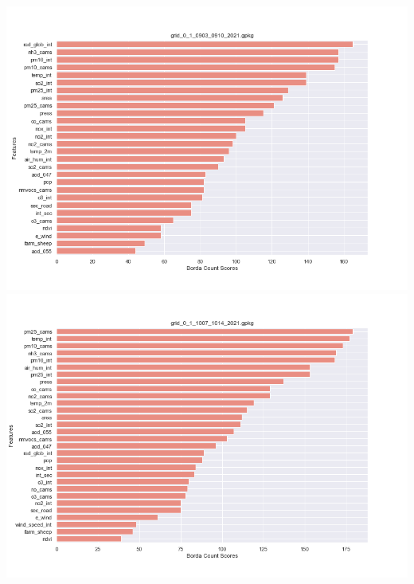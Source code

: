 \begin{center}
\includegraphics[width=.9\textwidth]{images/fs_results/nh3/01/montains/grid_0_1_0903_0910_2021.png}
\includegraphics[width=.9\textwidth]{images/fs_results/nh3/01/montains/grid_0_1_1007_1014_2021.png}
\end{center}

